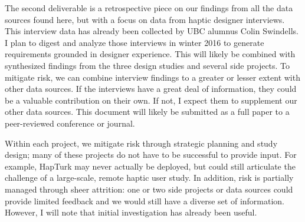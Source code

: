 The second deliverable is a retrospective piece on our findings from all the data sources found here, but with a focus on data from haptic designer interviews.
This interview data has already been collected by UBC alumnus Colin Swindells.
I plan to digest and analyze those interviews in winter 2016 to generate requirements grounded in designer experience.
This will likely be combined with synthesized findings from the three design studies and several side projects.
To mitigate risk, we can combine interview findings to a greater or lesser extent with other data sources.
If the interviews have a great deal of information, they could be a valuable contribution on their own.
If not, I expect them to supplement our other data sources.
This document will likely be submitted as a full paper to a peer-reviewed conference or journal.

Within each project, we mitigate risk through strategic planning and study design;
many of these projects do not have to be successful to provide input.
For example, HapTurk may never actually be deployed, but could still articulate the challenge of a large-scale, remote haptic user study.
In addition,
risk is partially managed through sheer attrition: one or two side projects or data sources could provide limited feedback and we would still have a diverse set of information. 
However, I will note that initial investigation has already been useful.

%


%
%
%
%





